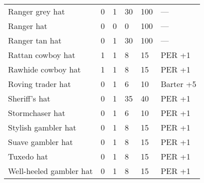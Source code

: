 \begin{longtable}{|p{4cm}|p{1.2cm}|p{1.2cm}|p{1.2cm}|p{1.2cm}|p{6cm}|}
Ranger grey hat  & 0 & 1 & 30 & 100 & —  \\
Ranger hat  & 0 & 0 & 0 & 100 & —  \\
Ranger tan hat  & 0 & 1 & 30 & 100 & —  \\
Rattan cowboy hat  & 1 & 1 & 8 & 15 & PER +1  \\
Rawhide cowboy hat  & 1 & 1 & 8 & 15 & PER +1  \\
Roving trader hat  & 0 & 1 & 6 & 10 & Barter +5  \\
Sheriff's hat  & 0 & 1 & 35 & 40 & PER +1  \\
Stormchaser hat  & 0 & 1 & 6 & 10 & PER +1  \\
Stylish gambler hat  & 0 & 1 & 8 & 15 & PER +1  \\
Suave gambler hat  & 0 & 1 & 8 & 15 & PER +1  \\
Tuxedo hat  & 0 & 1 & 8 & 15 & PER +1  \\
Well-heeled gambler hat  & 0 & 1 & 8 & 15 & PER +1  \\
\hline
\end{longtable}
